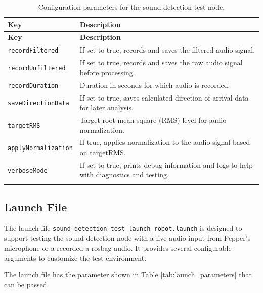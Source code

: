 \documentclass{CSSRforAfrica}
\begin{document}
\begin{longtable}{| l | p{10.5cm} |}
	\hline
	\rowcolor{blue!20}
	\textbf{Key} & \textbf{Description} \\
	\hline
	\endfirsthead
	
	\hline
	\rowcolor{blue!20}
	\textbf{Key} & \textbf{Description} \\
	\hline
	\endhead
	
	\texttt{recordFiltered} & If set to true, records and saves the filtered audio signal. \\
	\hline
	\texttt{recordUnfiltered} & If set to true, records and saves the raw audio signal before processing. \\
	\hline
	\texttt{recordDuration} & Duration in seconds for which audio is recorded. \\
	\hline
	\texttt{saveDirectionData} & If set to true, saves calculated direction-of-arrival data for later analysis. \\
	\hline
	\texttt{targetRMS} & Target root-mean-square (RMS) level for audio normalization. \\
	\hline
	\texttt{applyNormalization} & If true, applies normalization to the audio signal based on targetRMS. \\
	\hline
	\texttt{verboseMode} & If set to true, prints debug information and logs to help with diagnostics and testing. \\
	\hline
	
	\caption{Configuration parameters for the sound detection test node.}
	\label{tab:sound_detection_test_config}
\end{longtable}

\subsection*{Launch File}
The launch file \texttt{sound\_detection\_test\_launch\_robot.launch} is designed to support testing the sound detection node with a live audio input from Pepper's microphone or a recorded a rosbag audio. It provides several configurable arguments to customize the test environment.   

The launch file has the parameter shown in Table \ref{tab:launch_parameters} that can be passed.
\end{document}
